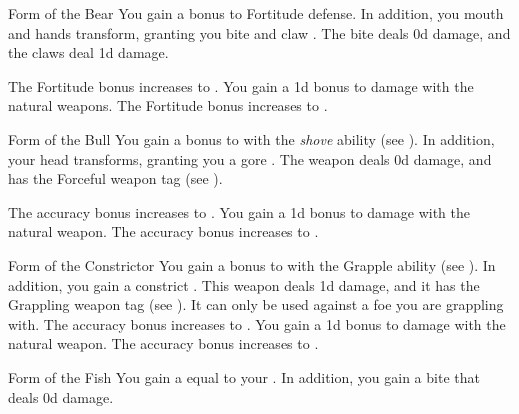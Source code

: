        {
            \begin{freeability}{Form of the Bear}
                You gain a  bonus to Fortitude defense.
                In addition, you mouth and hands transform, granting you bite and claw .
                The bite deals \plus0d damage, and the claws deal \minus1d damage.

                \rankline
                 The Fortitude bonus increases to .
                 You gain a \plus1d bonus to damage with the natural weapons.
                 The Fortitude bonus increases to .
            \end{freeability}

            \begin{freeability}{Form of the Bull}
                You gain a  bonus to  with the \textit{shove} ability (see ).
                In addition, your head transforms, granting you a gore .
                The weapon deals \plus0d damage, and has the Forceful weapon tag (see ).

                \rankline
                 The accuracy bonus increases to .
                 You gain a \plus1d bonus to damage with the natural weapon.
                 The accuracy bonus increases to .
            \end{freeability}

            \begin{freeability}{Form of the Constrictor}
                You gain a  bonus to  with the Grapple ability (see ).
                In addition, you gain a constrict .
                This weapon deals \plus1d damage, and it has the Grappling weapon tag (see ).
                It can only be used against a foe you are grappling with.
                \rankline
                 The accuracy bonus increases to .
                 You gain a \plus1d bonus to damage with the natural weapon.
                 The accuracy bonus increases to .
            \end{freeability}

            \begin{freeability}{Form of the Fish}
                You gain a  equal to your .
                In addition, you gain a bite  that deals \plus0d damage.


\end{freeability}}
